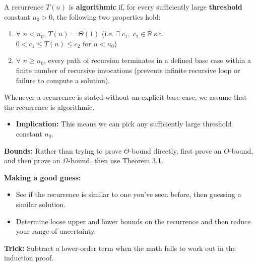 A recurrence $T(n)$ is \textbf{algorithmic} if, for every sufficiently large \textbf{threshold} constant $n_0 >0$, the following two properties hold:
\begin{enumerate}
    \item $\forall$ $n<n_0$, $T(n) = \Theta(1)$ (i.e. $\exists \; c_1, \; c_2 \in \mathbb{R}$ s.t. $0<c_1\leq T(n) \leq c_2 \text{ for } n<n_0$)
    \item $\forall$ $n \geq n_0$, every path of recursion terminates in a defined base case within a finite number of recursive invocations (prevents infinite recursive loop or failure to compute a solution).
\end{enumerate}

\begin{intuition}
    Whenever a recurrence is stated without an explicit base case, we assume that the recurrence is algorithmic.
    \begin{itemize}
        \item \textbf{Implication:} This means we can pick any sufficiently large threshold constant $n_0$.
    \end{itemize}
\end{intuition}

\item \textbf{Bounds:} Rather than trying to prove $\Theta$-bound directly, first prove an $O$-bound, and then prove an $\Omega$-bound, then use Theorem 3.1.
            \item \textbf{Making a good guess:}
            \begin{itemize}
                \item See if the recurrence is similar to one you've seen before, then guessing a similar solution.
                \item Determine loose upper and lower bounds on the recurrence and then reduce your range of uncertainty.
            \end{itemize}
            \item \textbf{Trick:} Subtract a lower-order term when the math fails to work out in the induction proof.
            
